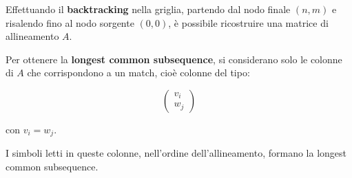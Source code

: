 Effettuando il \textbf{backtracking} nella griglia, partendo dal nodo finale
$(n,m)$ e risalendo fino al nodo sorgente $(0,0)$, è possibile ricostruire
una matrice di allineamento $A$.

Per ottenere la \textbf{longest common subsequence}, si considerano solo le
colonne di $A$ che corrispondono a un match, cioè colonne del tipo:

\[
\begin{pmatrix}
v_i \\
w_j
\end{pmatrix}
\]

con $v_i = w_j$.

I simboli letti in queste colonne, nell'ordine dell'allineamento, formano la
longest common subsequence.

\newpage
